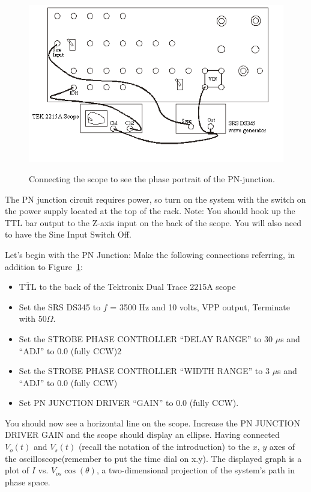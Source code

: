 \documentclass{../lab}
\begin{document}
\begin{figure}[h]
    \centering
    \href{http://experimentationlab.berkeley.edu/sites/default/files/images/Nldimage120.png}{\includegraphics[width=0.7\linewidth]{images/Nldimage120.png}}
    \caption{Connecting the scope to see the phase portrait of the PN-junction.}
    \label{fig:ConnectingTheScope}
\end{figure}

The PN junction circuit requires power, so turn on the system with the switch on the power supply located at the top of the rack. Note: You should hook up the TTL bar output to the Z-axis input on the back of the scope. You will also need to have the Sine Input Switch Off.

Let's begin with the PN Junction: Make the following connections referring, in addition to Figure~\ref{fig:ConnectingTheScope}:

\begin{itemize}
    \item $\overline{\text{TTL}}$ to the back of the Tektronix Dual Trace 2215A scope

    \item Set the SRS DS345 to $f$ = 3500 Hz and 10 volts, VPP output, Terminate with $50\Omega$.

    \item Set the STROBE PHASE CONTROLLER ``DELAY RANGE'' to 30 $\mu$s and ``ADJ'' to 0.0 (fully CCW)2

    \item Set the STROBE PHASE CONTROLLER ``WIDTH RANGE'' to 3 $\mu$s and ``ADJ'' to 0.0 (fully CCW)

    \item Set PN JUNCTION DRIVER ``GAIN'' to 0.0 (fully CCW).

\end{itemize}

You should now see a horizontal line on the scope. Increase the PN JUNCTION DRIVER GAIN and the scope should display an ellipse. Having connected $ V_o(t) $ and $ V_s(t) $ (recall the notation of the introduction) to the $x$, $y$ axes of the oscilloscope(remember to put the time dial on x.y). The displayed graph is a plot of $I$ vs. $V_{os} \cos(\theta)$, a two-dimensional projection of the system's path in phase space.
\end{document}

